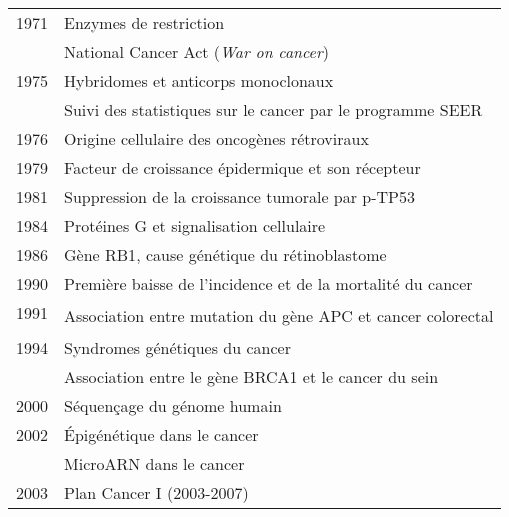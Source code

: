 \begin{table}
\begin{center}
\begin{tabular}{cl}
						1971          & Enzymes de restriction                                                                  \\
										& National Cancer Act (\emph{War on cancer})                                              \\
						1975          & Hybridomes et anticorps monoclonaux                                                     \\
										& Suivi des statistiques sur le cancer par le programme \acs{SEER}                        \\
						1976          & Origine cellulaire des oncogènes rétroviraux                                            \\
						1979          & Facteur de croissance épidermique et son récepteur                                      \\
						1981          & Suppression de la croissance tumorale par \acs{p-TP53}                                  \\
						1984          & Protéines G et signalisation cellulaire                                                 \\
						1986          & Gène \acs{RB1}, cause génétique du rétinoblastome                                       \\
						1990          & Première baisse de l'incidence et de la mortalité du cancer                             \\
						1991          & \multirow{2}{6.5cm}{Association entre mutation du gène \acs{APC} et cancer colorectal}  \\
						& \\
						1994          & Syndromes génétiques du cancer                                                          \\
										& Association entre le gène \acs{BRCA1} et le cancer du sein\index{cancer!cancer du sein} \\
						2000          & Séquençage du génome humain                                                             \\
						2002          & Épigénétique dans le cancer                                                             \\
										& MicroARN dans le cancer                                                                 \\
						2003          & Plan Cancer I (2003-2007)                                                               \\

\end{tabular}
\end{center}
\end{table}
